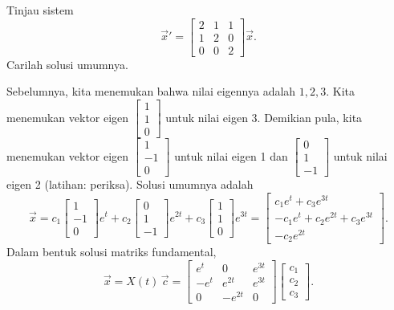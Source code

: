 \begin{example}
Tinjau sistem
\begin{equation*}
{\vec{x}}'
=
\begin{bmatrix}
2 & 1 & 1 \\
1 & 2 & 0 \\
0 & 0 & 2
\end{bmatrix}
\vec{x} .
\end{equation*}
Carilah solusi umumnya.

Sebelumnya, kita menemukan bahwa nilai eigennya adalah $1,2,3$.  Kita menemukan vektor eigen
$\left[ \begin{smallmatrix} 1 \\ 1 \\ 0 \end{smallmatrix} \right]$
untuk nilai eigen 3.  Demikian pula,
kita menemukan vektor eigen
$\left[ \begin{smallmatrix} 1 \\ -1 \\ 0 \end{smallmatrix} \right]$
untuk nilai eigen 1 dan
$\left[ \begin{smallmatrix} 0 \\ 1 \\ -1 \end{smallmatrix} \right]$
untuk nilai eigen 2 (latihan: periksa).
Solusi umumnya adalah
\begin{equation*}
\vec{x} =
c_1
\begin{bmatrix}
1 \\ -1 \\ 0
\end{bmatrix}
e^t
+
c_2
\begin{bmatrix}
0 \\ 1 \\ -1
\end{bmatrix}
e^{2t}
+
c_3
\begin{bmatrix}
1 \\ 1 \\ 0
\end{bmatrix}
e^{3t}
=
\begin{bmatrix}
c_1 e^t+c_3 e^{3t} \\ -c_1 e^t + c_2 e^{2t} + c_3 e^{3t} \\ - c_2 e^{2t}
\end{bmatrix} .
\end{equation*}
Dalam bentuk solusi matriks fundamental,
\begin{equation*}
\vec{x} = X(t)\, \vec{c}
=
\begin{bmatrix}
e^t & 0 & e^{3t} \\
-e^t & e^{2t} & e^{3t} \\
0 & -e^{2t} & 0
\end{bmatrix}
\begin{bmatrix}
c_1 \\ c_2 \\ c_3
\end{bmatrix} .
\end{equation*}
\end{example}

